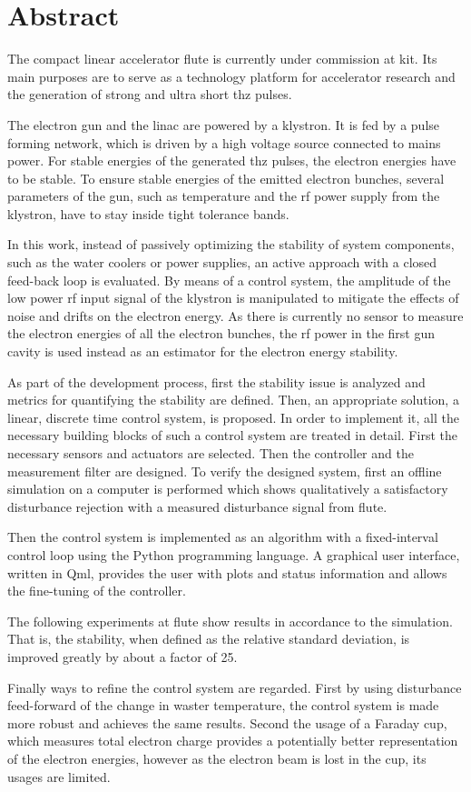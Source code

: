 \chapter*{Abstract}
The compact linear accelerator \gls{flute} is currently under commission at \gls{kit}. Its main purposes are to serve as a technology platform for accelerator research and the generation of strong and ultra short \gls{thz} pulses.

The electron gun and the \gls{linac} are powered by a klystron. It is fed by a pulse forming network, which is driven by a high voltage source connected to mains power. For stable energies of the generated \gls{thz} pulses, the electron energies have to be stable. To ensure stable energies of the emitted electron bunches, several parameters of the gun, such as temperature and the \gls{rf} power supply from the klystron, have to stay inside tight tolerance bands.

In this work, instead of passively optimizing the stability of system components, such as the water coolers or power supplies, an active approach with a closed feed-back loop is evaluated. By means of a control system, the amplitude of the low power \gls{rf} input signal of the klystron is manipulated to mitigate the effects of noise and drifts on the electron energy. As there is currently no sensor to measure the electron energies of all the electron bunches, the \gls{rf} power in the first gun cavity is used instead as an estimator for the electron energy stability.

As part of the development process, first the stability issue is analyzed and metrics for quantifying the stability are defined. Then, an appropriate solution, a linear, discrete time control system, is proposed. In order to implement it, all the necessary building blocks of such a control system are treated in detail. First the necessary sensors and actuators are selected. Then the controller and the measurement filter are designed. To verify the designed system, first an offline simulation on a computer is performed which shows qualitatively a satisfactory disturbance rejection with a measured disturbance signal from \gls{flute}. 

Then the control system is implemented as an algorithm with a fixed-interval control loop using the Python programming language. A graphical user interface, written in Qml, provides the user with plots and status information and allows the fine-tuning of the controller.

The following experiments at \gls{flute} show results in accordance to the simulation. That is, the stability, when defined as the relative standard deviation, is improved greatly by about a factor of \num{25}.

Finally ways to refine the control system are regarded. First by using disturbance feed-forward of the change in waster temperature, the control system is made more robust and achieves the same results. Second the usage of a Faraday cup, which measures total electron charge provides a potentially better representation of the electron energies, however as the electron beam is lost in the cup, its usages are limited.
\cleardoublepage
